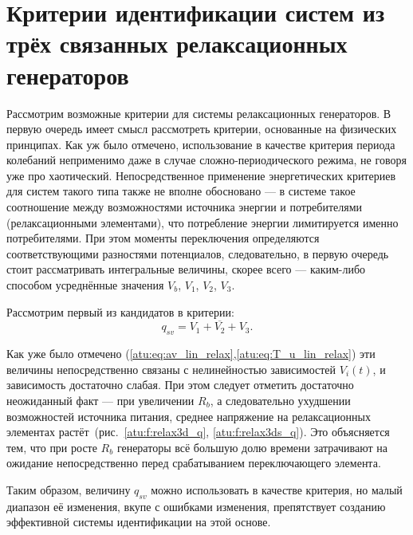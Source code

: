 



\section{Критерии идентификации систем из трёх связанных релаксационных генераторов}

Рассмотрим возможные критерии для системы релаксационных
генераторов. В первую очередь имеет смысл
рассмотреть критерии, основанные на физических принципах.
Как уж было отмечено, использование в качестве критерия периода
колебаний неприменимо даже в случае сложно-периодического режима,
не говоря уже про хаотический.
Непосредственное применение энергетических критериев
для систем такого типа также не вполне обосновано ---
в системе такое соотношение между возможностями источника энергии
и потребителями (релаксационными элементами), что
потребление энергии лимитируется именно потребителями.
При этом моменты переключения определяются соответствующими разностями
потенциалов, следовательно, в первую очередь стоит рассматривать
интегральные величины, скорее всего --- каким-либо способом усреднённые значения
$V_b$, $V_1$, $V_2$, $V_3$.

Рассмотрим первый из кандидатов в критерии:
\begin{equation}
  q_{sv} = \overline{V_1+V_2+V_3} .
  \label{atu:eq:q_sv_relax}
\end{equation}


Как уже было отмечено (\ref{atu:eq:av_lin_relax},\ref{atu:eq:T_u_lin_relax})
эти величины непосредственно связаны с нелинейностью
зависимостей $V_i(t)$, и зависимость достаточно слабая.
При этом следует отметить достаточно неожиданный факт ---
при увеличении $R_b$, а следовательно ухудшении
возможностей источника питания, среднее напряжение
на релаксационных элементах растёт~(рис.~\ref{atu:f:relax3d_q}, \ref{atu:f:relax3ds_q}).
Это объясняется тем,
что при росте $R_b$ генераторы всё большую долю времени
затрачивают на ожидание непосредственно перед срабатыванием переключающего
элемента.

Таким образом, величину $q_{sv}$ можно использовать в качестве критерия,
но малый диапазон её изменения, вкупе с ошибками изменения,
препятствует созданию эффективной системы идентификации на этой основе.


